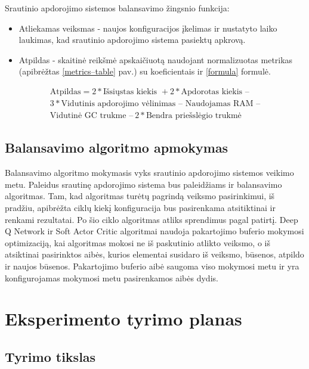 \documentclass{VUMIFPSbakalaurinis}
\begin{document}
Srautinio apdorojimo sistemos balansavimo žingsnio funkcija:
\begin{itemize}
 \item Atliekamas veiksmas -  naujos konfiguracijos įkelimas ir nustatyto laiko laukimas, kad srautinio apdorojimo sistema pasiektų apkrovą.
 \item Atpildas - skaitinė reikšmė apskaičiuotą naudojant normalizuotas metrikas (apibrėžtas \ref{metrics–table} pav.) su koeficientais ir \ref{formula} formulė.
\end{itemize}
\begin{equation}
    \label{formula}
    \begin{gathered}
    \text{Atpildas} = 2*\text{Išsiųstas kiekis } + 2*\text{Apdorotas kiekis }  – \\ 
        3*\text{Vidutinis apdorojimo vėlinimas } – \text{ Naudojamas RAM }  – \\
          \text{Vidutinė GC trukme } – \:2*\text{Bendra priešslėgio trukmė} 
    \end{gathered}
\end{equation}
\subsection{Balansavimo algoritmo apmokymas}

Balansavimo algoritmo mokymasis vyks srautinio apdorojimo sistemos veikimo metu. Paleidus srautinę apdorojimo sistema bus paleidžiams ir balansavimo algoritmas. Tam, kad algoritmas turėtų pagrindą veiksmo pasirinkimui, iš pradžiu, apibrėžta ciklų kiekį konfiguracija bus pasirenkama atsitiktinai ir renkami rezultatai. Po šio ciklo algoritmas atliks sprendimus pagal patirtį. Deep Q Network ir Soft Actor Critic algoritmai naudoja pakartojimo buferio mokymosi optimizaciją, kai algoritmas mokosi ne iš paskutinio atlikto veiksmo, o iš atsiktinai pasirinktos aibės, kurios elementai susidaro iš veiksmo, būsenos, atpildo ir naujos būsenos. Pakartojimo buferio aibė saugoma viso mokymosi metu ir yra konfigurojamas mokymosi metu pasirenkamos aibės dydis. 

\section{Eksperimento tyrimo planas}

\subsection{Tyrimo tikslas}
\end{document}
